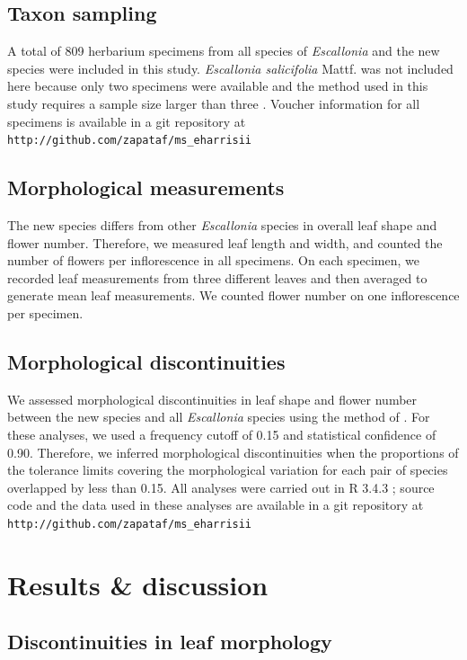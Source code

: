 \documentclass[fleqn,10pt,lineno]{wlpeerj} %
\begin{document}
\subsection*{Taxon sampling}

A total of 809 herbarium specimens from all species of \emph{Escallonia} and the new species were included in this study. \emph{Escallonia salicifolia} Mattf. was not included here because only two specimens were available and the method used in this study requires a sample size larger than three \citep{Zapata:2012it}. Voucher information for all specimens is available in a git repository at \texttt{http://github.com/zapataf/ms\_eharrisii}

\subsection*{Morphological measurements}

The new species differs from other \emph{Escallonia} species in overall leaf shape and flower number. Therefore, we measured leaf length and width, and counted the number of flowers per inflorescence in all specimens. On each specimen, we recorded leaf measurements from three different leaves and then averaged to generate mean leaf measurements. We counted flower number on one inflorescence per specimen.

\subsection*{Morphological discontinuities}

We assessed morphological discontinuities in leaf shape and flower number between the new species and all \emph{Escallonia} species using the method of \cite{Zapata:2012it}. For these analyses, we used a frequency cutoff of 0.15 and statistical confidence of 0.90. Therefore, we inferred morphological discontinuities when the proportions of the tolerance limits covering the morphological variation for each pair of species overlapped by less than 0.15. All analyses were carried out in R 3.4.3 \citep{R-base}; source code and the data used in these analyses are available in a git repository at \texttt{http://github.com/zapataf/ms\_eharrisii}

\section*{Results \& discussion}

\subsection*{Discontinuities in leaf morphology}
\end{document}
